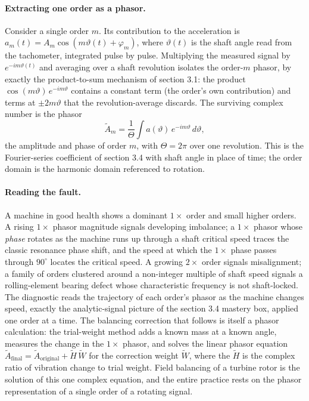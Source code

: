 \paragraph{Extracting one order as a phasor.} Consider a single order $m$.
Its contribution to the acceleration is $a_{m}(t) = A_{m}\cos(m\vartheta(t) +
\varphi_{m})$, where $\vartheta(t)$ is the shaft angle read from the
tachometer, integrated pulse by pulse. Multiplying the measured signal by
$e^{-i m\vartheta(t)}$ and averaging over a shaft revolution isolates the
order-$m$ phasor, by exactly the product-to-sum mechanism of section 3.1: the
product $\cos(m\vartheta)\,e^{-i m\vartheta}$ contains a constant term (the
order's own contribution) and terms at $\pm 2m\vartheta$ that the
revolution-average discards. The surviving complex number is the phasor
\[
\tilde A_{m} = \frac{1}{\Theta}\int a(\vartheta)\,e^{-i m\vartheta}\,d\vartheta,
\]
the amplitude and phase of order $m$, with $\Theta = 2\pi$ over one
revolution. This is the Fourier-series coefficient of section 3.4 with shaft
angle in place of time; the order domain is the harmonic domain referenced to
rotation.

\paragraph{Reading the fault.} A machine in good health shows a dominant
$1\times$ order and small higher orders. A rising $1\times$ phasor magnitude
signals developing imbalance; a $1\times$ phasor whose \emph{phase} rotates as
the machine runs up through a shaft critical speed traces the classic
resonance phase shift, and the speed at which the $1\times$ phase passes
through $90^{\circ}$ locates the critical speed. A growing $2\times$ order
signals misalignment; a family of orders clustered around a non-integer
multiple of shaft speed signals a rolling-element bearing defect whose
characteristic frequency is not shaft-locked. The diagnostic reads the
trajectory of each order's phasor as the machine changes speed, exactly the
analytic-signal picture of the section 3.4 mastery box, applied one order at a
time. The balancing correction that follows is itself a phasor calculation:
the trial-weight method adds a known mass at a known angle, measures the
change in the $1\times$ phasor, and solves the linear phasor equation
$\tilde A_{\text{final}} = \tilde A_{\text{original}} + \tilde H\,\tilde W$
for the correction weight $\tilde W$, where the  $\tilde H$ is the complex ratio of vibration change to trial
weight. Field balancing of a turbine rotor is the solution of this one
complex equation, and the entire practice rests on the phasor representation
of a single order of a rotating signal.


